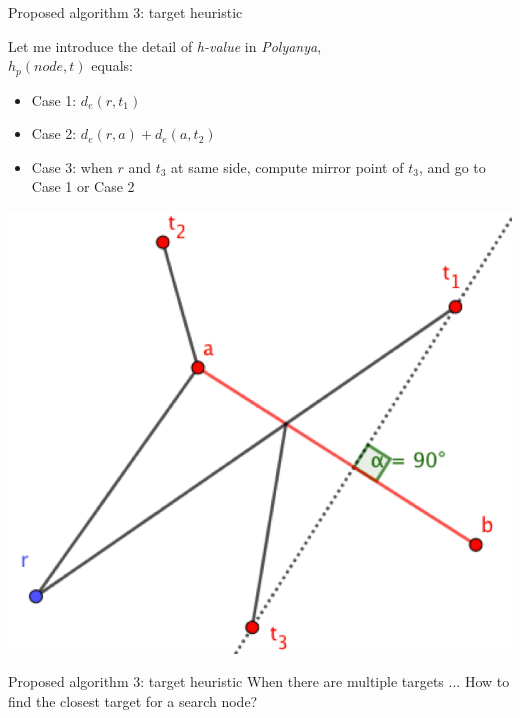 \begin{frame}{Proposed algorithm 3: target heuristic}
\begin{minipage}{.5\textwidth}
\small{Let me introduce the detail of \textit{h-value} in \textit{Polyanya},\\
$h_p(node, t)$ equals}:
\begin{itemize}
    \item<2-> \small Case 1: $d_e(r, t_1)$
    \item<3-> \small Case 2: $d_e(r, a) + d_e(a, t_2)$
    \item<4-> \small Case 3: when $r$ and $t_3$ at same side, compute mirror point of $t_3$, and go to Case 1 or Case 2
    
\end{itemize}

\end{minipage}%
\begin{minipage}{.5\textwidth}
    \begin{adjustbox}{max totalsize={.9\textwidth}{.9\textheight}, right}
    \centering
    \includegraphics{pic/ef.png}
    \end{adjustbox}
\end{minipage}
\end{frame}

\begin{frame}{Proposed algorithm 3: target heuristic}
\small{
When there are multiple targets ...
}
\small{
    How to find the closest target for a search node?
}
\end{frame}

